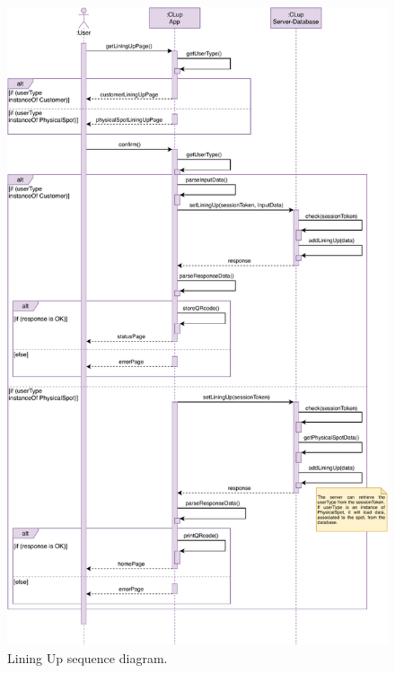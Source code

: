 \begin{figure}[H]
	\centering
	\includegraphics[width=1.0\textwidth]{images/liningUp_sequence_diagram.pdf}
	\caption{Lining Up sequence diagram.}
	\label{figure:liningUpSequenceDiagram}
\end{figure}

